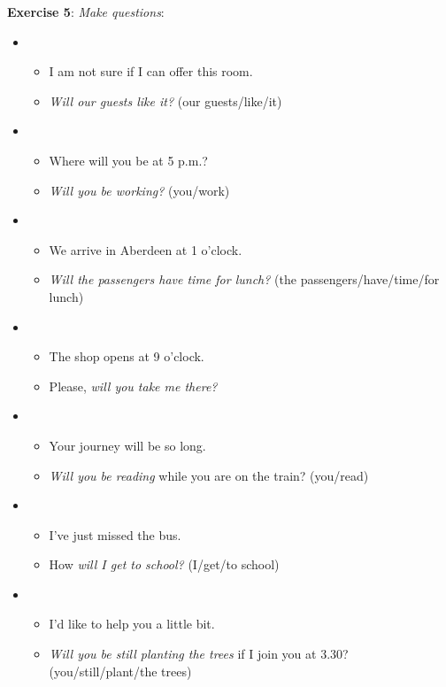 \textbf{Exercise 5}: \textit{Make questions}:

\begin{itemize}

\item
\begin{itemize}
\item I am not sure if I can offer this room. 
\item \textit{Will our guests like it?} (our guests/like/it)
\end{itemize}

\item
\begin{itemize}
\item Where will you be at 5 p.m.?
\item \textit{Will you be working?} (you/work)
\end{itemize}

\item
\begin{itemize}
\item We arrive in Aberdeen at 1 o'clock.
\item \textit{Will the passengers have time for lunch?} (the passengers/have/time/for lunch)
\end{itemize}

\item
\begin{itemize}
\item The shop opens at 9 o'clock. 
\item Please, \textit{will you take me there?}
\end{itemize}

\item
\begin{itemize}
\item Your journey will be so long.
\item \textit{Will you be reading} while you are on the train? (you/read)
\end{itemize}

\item
\begin{itemize}
\item I've just missed the bus.
\item How \textit{will I get to school?} (I/get/to school)
\end{itemize}

\item
\begin{itemize}
\item I'd like to help you a little bit. 
\item \textit{Will you be still planting the trees} if I join you at 3.30? (you/still/plant/the trees) 
\end{itemize}


\end{itemize}
